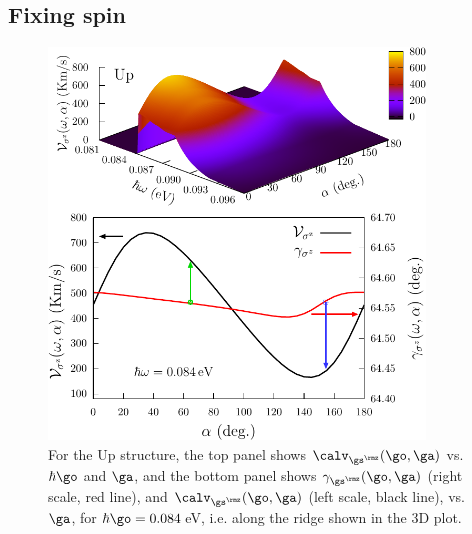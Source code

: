 \documentclass[floatfix,prb,aps,superscriptaddress,showpacs,11pt,preprint,letterpaper]{revtex4}
\def\tama{10cm}
\begin{document}
\subsection{Fixing spin} %
\label{sec:res-fixspin}

\begin{figure}[t]
\centering
\includegraphics[width=\tama]{upplots/up-vsz-w1}
\caption{For the Up structure, the top panel shows 
$\calv_{\gs^\rmz}(\go,\ga)$ vs. $\hbar\go$ and $\ga$, and the bottom panel
shows $\gamma_{\gs^\rmz}(\go,\ga)$ (right scale, red line), and
$\calv_{\gs^\rmz}(\go,\ga)$ (left scale, black line), vs. $\ga$, for
$\hbar\go=0.084$\,eV, i.e. along the ridge shown in the 3D plot. }
\label{fig:up-vsz-w1}
\end{figure}
\end{document}
